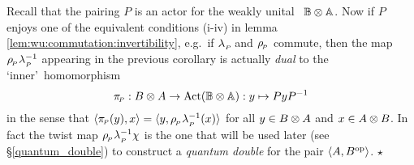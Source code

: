 \begin{remark_sec} \label{rem:multipl:preview:QD} \rm
Recall that the pairing $P$ is an actor for the weakly unital \context\ $\mathbb{B} \otimes \mathbb{A}$.
Now if $P$ enjoys one of the equivalent conditions (i-iv) in
lemma \ref{lem:wu:commutation:invertibility}, e.g.\ if $\lambda_{_P\!}$ and $\rho_{_{\!P}}$ commute,
then the map $\rho_{_{\!P}}\lambda_{_P\!}^{-1}$ appearing in the previous corollary is
actually {\em dual\/} to the \lq inner\rq\ homomorphism
$$ \pi_{\scriptscriptstyle \! P} : B \otimes A \rightarrow \mbox{\rm Act}(\mathbb{B} \otimes \mathbb{A}): y \mapsto P y P^{-1} $$
in the sense that $\langle \pi_{\scriptscriptstyle \! P}(y),x \rangle = \langle y,\rho_{_{\!P}}\lambda_{_P\!}^{-1}(x) \rangle$
for all $y \in B \otimes A$ and $x \in A \otimes B$.
In fact the twist map $\rho_{_{\!P}}\lambda_{_P\!}^{-1}\chi$ is the one that will be used
later (see  \S \ref{quantum_double}) to construct a {\em quantum double\/}
for the pair $\langle A,B^{\rm op} \rangle$.
\hfill $\star$
\end{remark_sec}
